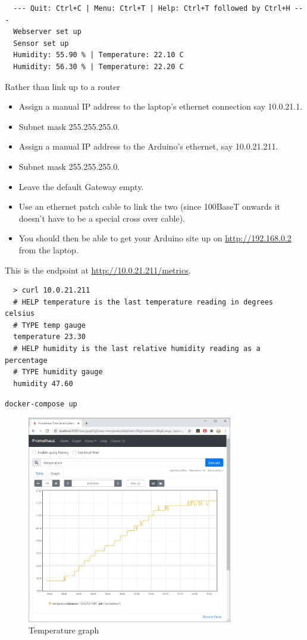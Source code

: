 \documentclass[a4paper, 12pt]{article}
\begin{document}
\begin{verbatim}
  --- Quit: Ctrl+C | Menu: Ctrl+T | Help: Ctrl+T followed by Ctrl+H ---
  Webserver set up
  Sensor set up
  Humidity: 55.90 % | Temperature: 22.10 C
  Humidity: 56.30 % | Temperature: 22.20 C
\end{verbatim}


Rather than link up to a router

\begin{itemize}
  \item Assign a manual IP address to the laptop's ethernet connection say 10.0.21.1.
  \item Subnet mask 255.255.255.0.
  \item Assign a manual IP address to the Arduino's ethernet, say 10.0.21.211.
  \item Subnet mask 255.255.255.0.
  \item Leave the default Gateway empty.
  \item Use an ethernet patch cable to link the two (since 100BaseT onwards it doesn't have to be a special cross over cable).
  \item You should then be able to get your Arduino site up on \url{http://192.168.0.2} from the laptop.
\end{itemize}
  
This is the endpoint at \url{http://10.0.21.211/metrics}.
  
\begin{verbatim}
  > curl 10.0.21.211
  # HELP temperature is the last temperature reading in degrees celsius
  # TYPE temp gauge
  temperature 23.30
  # HELP humidity is the last relative humidity reading as a percentage
  # TYPE humidity gauge
  humidity 47.60
\end{verbatim}

\verb|docker-compose up|

\begin{figure}[H]
  \centering
  \includegraphics[width=0.8\textwidth]{graph.jpg}
  \caption{Temperature graph}
\end{figure}
  
\end{document}

